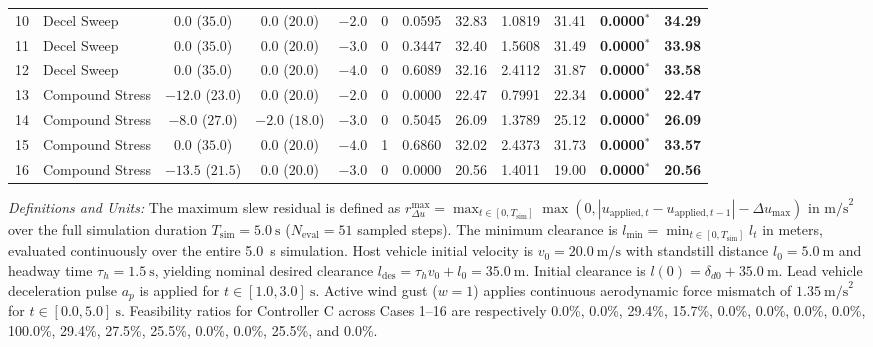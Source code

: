 \documentclass[journal]{IEEEtran}
\begin{document}
\begin{table}[t]
\begin{tabular}{clcccccccccc}
10 & Decel Sweep & $0.0$ ($35.0$) & $0.0$ ($20.0$) & $-2.0$ & 0 & 0.0595 & 32.83 & 1.0819 & 31.41 & \textbf{0.0000}$^*$ & \textbf{34.29} \\
11 & Decel Sweep & $0.0$ ($35.0$) & $0.0$ ($20.0$) & $-3.0$ & 0 & 0.3447 & 32.40 & 1.5608 & 31.49 & \textbf{0.0000}$^*$ & \textbf{33.98} \\
12 & Decel Sweep & $0.0$ ($35.0$) & $0.0$ ($20.0$) & $-4.0$ & 0 & 0.6089 & 32.16 & 2.4112 & 31.87 & \textbf{0.0000}$^*$ & \textbf{33.58} \\
\midrule
13 & Compound Stress & $-12.0$ ($23.0$) & $0.0$ ($20.0$) & $-2.0$ & 0 & 0.0000 & 22.47 & 0.7991 & 22.34 & \textbf{0.0000}$^*$ & \textbf{22.47} \\
14 & Compound Stress & $-8.0$ ($27.0$) & $-2.0$ ($18.0$) & $-3.0$ & 0 & 0.5045 & 26.09 & 1.3789 & 25.12 & \textbf{0.0000}$^*$ & \textbf{26.09} \\
15 & Compound Stress & $0.0$ ($35.0$) & $0.0$ ($20.0$) & $-4.0$ & 1 & 0.6860 & 32.02 & 2.4373 & 31.73 & \textbf{0.0000}$^*$ & \textbf{33.57} \\
16 & Compound Stress & $-13.5$ ($21.5$) & $0.0$ ($20.0$) & $-3.0$ & 0 & 0.0000 & 20.56 & 1.4011 & 19.00 & \textbf{0.0000}$^*$ & \textbf{20.56} \\
\bottomrule
\end{tabular}
\begin{flushleft}
\footnotesize
\emph{Definitions and Units:} The maximum slew residual is defined as $r_{\Delta u}^{\max} = \max_{t \in [0, T_{\mathrm{sim}}]} \max(0, |u_{\mathrm{applied},t} - u_{\mathrm{applied},t-1}| - \Delta u_{\max})$ in $\text{m/s}^2$ over the full simulation duration $T_{\mathrm{sim}} = 5.0~\text{s}$ ($N_{\mathrm{eval}} = 51$ sampled steps). The minimum clearance is $l_{\min} = \min_{t \in [0, T_{\mathrm{sim}}]} l_t$ in meters, evaluated continuously over the entire 5.0~s simulation. Host vehicle initial velocity is $v_0 = 20.0~\text{m/s}$ with standstill distance $l_0 = 5.0~\text{m}$ and headway time $\tau_h = 1.5~\text{s}$, yielding nominal desired clearance $l_{\mathrm{des}} = \tau_h v_0 + l_0 = 35.0~\text{m}$. Initial clearance is $l(0) = \delta_{d0} + 35.0~\text{m}$. Lead vehicle deceleration pulse $a_p$ is applied for $t \in [1.0, 3.0]~\text{s}$. Active wind gust ($w = 1$) applies continuous aerodynamic force mismatch of $1.35~\text{m/s}^2$ for $t \in [0.0, 5.0]~\text{s}$. Feasibility ratios for Controller C across Cases 1--16 are respectively 0.0\%, 0.0\%, 29.4\%, 15.7\%, 0.0\%, 0.0\%, 0.0\%, 0.0\%, 100.0\%, 29.4\%, 27.5\%, 25.5\%, 0.0\%, 0.0\%, 25.5\%, and 0.0\%.\\

\end{flushleft}
\end{table}
\end{document}
